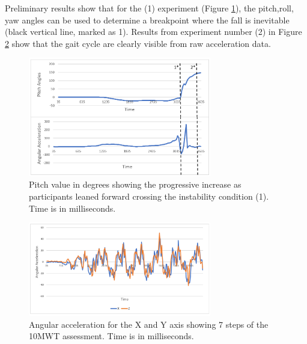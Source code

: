 \documentclass[conference]{IEEEtran}
\begin{document}
Preliminary results show that for the (1) experiment (Figure \ref{fig:vestibular}), the pitch,roll, yaw angles can be used to determine a breakpoint where the fall is inevitable (black vertical line, marked as 1).   Results from experiment number (2) in Figure \ref{fig:gait} show that the gait cycle are clearly visible from raw acceleration data.

\begin{figure}[h!]
\centering
\includegraphics[width=8cm]{vestibular.png}
\caption{Pitch value in degrees showing the progressive increase as participants leaned forward crossing the instability condition (1).  Time is in milliseconds. }
\label{fig:vestibular}
\end{figure}


\begin{figure}[h!]
\centering
\includegraphics[width=8cm]{gait.png}
\caption{Angular acceleration for the X and Y axis showing 7 steps of the 10MWT assessment.  Time is in milliseconds. }
\label{fig:gait}
\end{figure}

%
%
%
\end{document}
